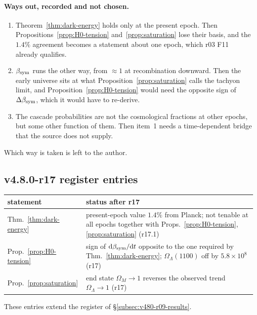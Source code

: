 \paragraph{Ways out, recorded and not chosen.}
\begin{enumerate}[leftmargin=2em]
\item[(a)] Theorem~\ref{thm:dark-energy} holds only at the present epoch.  Then
Propositions~\ref{prop:H0-tension} and~\ref{prop:saturation} lose their basis, and the \(1.4\%\) agreement becomes
a statement about one epoch, which r03 F11 already qualifies.
\item[(b)] \(\beta_{\mathrm{sym}}\) runs the other way, from \(\approx1\) at recombination downward.  Then the early universe sits at
what Proposition~\ref{prop:saturation} calls the tachyon limit, and Proposition~\ref{prop:H0-tension} would need the
opposite sign of \(\Delta\beta_{\mathrm{sym}}\), which it would have to re-derive.
\item[(c)] The cascade probabilities are not the cosmological fractions at other epochs, but some other function of
them.  Then item~1 needs a time-dependent bridge that the source does not supply.
\end{enumerate}
Which way is taken is left to the author.

\subsection*{v4.8.0-r17 register entries}
\label{subsec:v480-r17-register}

\begin{center}
\small
\begin{tabular}{@{}>{\raggedright\arraybackslash}p{}>{\raggedright\arraybackslash}p{}@{}}
\toprule
statement & status after r17\\
\midrule
Thm.~\ref{thm:dark-energy} & present-epoch value \(1.4\%\) from Planck; not tenable at all epochs together with Props.~\ref{prop:H0-tension}, \ref{prop:saturation} (r17.1)\\
Prop.~\ref{prop:H0-tension} & sign of \(\mathrm d\beta_{\mathrm{sym}}/\mathrm dt\) opposite to the one required by Thm.~\ref{thm:dark-energy}; \(\Omega_\Lambda(1100)\) off by \(5.8\times10^8\) (r17)\\
Prop.~\ref{prop:saturation} & end state \(\Omega_M\to1\) reverses the observed trend \(\Omega_\Lambda\to1\) (r17)\\
\bottomrule
\end{tabular}
\end{center}
These entries extend the register of \S\ref{subsec:v480-r09-results}.

